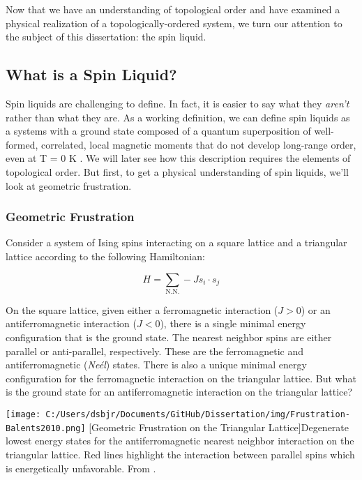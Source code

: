 Now that we have an understanding of topological order and have examined a physical realization of a topologically-ordered system, we turn our attention to the subject of this dissertation: the spin liquid.

\subsection{What is a Spin Liquid?}

Spin liquids are challenging to define. In fact, it is easier to say what they \textit{aren't} rather than what they are. As a working definition, we can define spin liquids as a systems with a ground state composed of a quantum superposition of well-formed, correlated, local magnetic moments that do not develop long-range order, even at T = 0 K \cite{Balents2010}. We will later see how this description requires the elements of topological order. But first, to get a physical understanding of spin liquids, we'll look at geometric frustration.

\subsubsection{Geometric Frustration}

Consider a system of Ising spins interacting on a square lattice and a triangular lattice according to the following Hamiltonian: 

\begin{equation}
H = \sum_{\text{N.N.}} -J s_{i} \cdot s_{j}
\end{equation}

On the square lattice, given either a ferromagnetic interaction ($J > 0$) or an antiferromagnetic interaction ($J < 0$), there is a single minimal energy configuration that is the ground state. The nearest neighbor spins are either parallel or anti-parallel, respectively. These are the ferromagnetic and antiferromagnetic (\textit{Ne{\'e}l}) states. There is also a unique minimal energy configuration for the ferromagnetic interaction on the triangular lattice. But what is the ground state for an antiferromagnetic interaction on the triangular lattice?

\begin{centering}
\texttt{[image: C:/Users/dsbjr/Documents/GitHub/Dissertation/img/Frustration-Balents2010.png]}
  \captionsetup{width=0.75\textwidth}
  [Geometric Frustration on the Triangular Lattice]{Degenerate lowest energy states for the antiferromagnetic nearest neighbor interaction on the triangular lattice. Red lines highlight the interaction between parallel spins which is energetically unfavorable. From \cite{Balents2010}.}
  \label{fig:Frustration1}
\end{centering}

